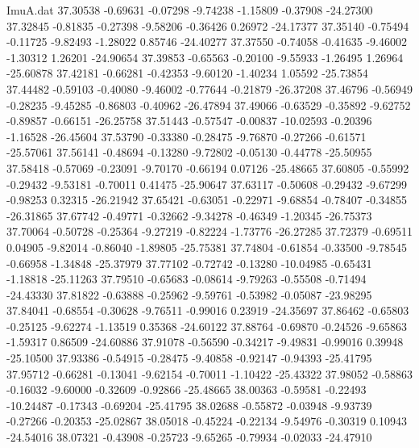 \begin{filecontents}{ImuA.dat}
  37.30538   -0.69631   -0.07298   -9.74238   -1.15809   -0.37908  -24.27300
  37.32845   -0.81835   -0.27398   -9.58206   -0.36426    0.26972  -24.17377
  37.35140   -0.75494   -0.11725   -9.82493   -1.28022    0.85746  -24.40277
  37.37550   -0.74058   -0.41635   -9.46002   -1.30312    1.26201  -24.90654
  37.39853   -0.65563   -0.20100   -9.55933   -1.26495    1.26964  -25.60878
  37.42181   -0.66281   -0.42353   -9.60120   -1.40234    1.05592  -25.73854
  37.44482   -0.59103   -0.40080   -9.46002   -0.77644   -0.21879  -26.37208
  37.46796   -0.56949   -0.28235   -9.45285   -0.86803   -0.40962  -26.47894
  37.49066   -0.63529   -0.35892   -9.62752   -0.89857   -0.66151  -26.25758
  37.51443   -0.57547   -0.00837  -10.02593   -0.20396   -1.16528  -26.45604
  37.53790   -0.33380   -0.28475   -9.76870   -0.27266   -0.61571  -25.57061
  37.56141   -0.48694   -0.13280   -9.72802   -0.05130   -0.44778  -25.50955
  37.58418   -0.57069   -0.23091   -9.70170   -0.66194    0.07126  -25.48665
  37.60805   -0.55992   -0.29432   -9.53181   -0.70011    0.41475  -25.90647
  37.63117   -0.50608   -0.29432   -9.67299   -0.98253    0.32315  -26.21942
  37.65421   -0.63051   -0.22971   -9.68854   -0.78407   -0.34855  -26.31865
  37.67742   -0.49771   -0.32662   -9.34278   -0.46349   -1.20345  -26.75373
  37.70064   -0.50728   -0.25364   -9.27219   -0.82224   -1.73776  -26.27285
  37.72379   -0.69511    0.04905   -9.82014   -0.86040   -1.89805  -25.75381
  37.74804   -0.61854   -0.33500   -9.78545   -0.66958   -1.34848  -25.37979
  37.77102   -0.72742   -0.13280  -10.04985   -0.65431   -1.18818  -25.11263
  37.79510   -0.65683   -0.08614   -9.79263   -0.55508   -0.71494  -24.43330
  37.81822   -0.63888   -0.25962   -9.59761   -0.53982   -0.05087  -23.98295
  37.84041   -0.68554   -0.30628   -9.76511   -0.99016    0.23919  -24.35697
  37.86462   -0.65803   -0.25125   -9.62274   -1.13519    0.35368  -24.60122
  37.88764   -0.69870   -0.24526   -9.65863   -1.59317    0.86509  -24.60886
  37.91078   -0.56590   -0.34217   -9.49831   -0.99016    0.39948  -25.10500
  37.93386   -0.54915   -0.28475   -9.40858   -0.92147   -0.94393  -25.41795
  37.95712   -0.66281   -0.13041   -9.62154   -0.70011   -1.10422  -25.43322
  37.98052   -0.58863   -0.16032   -9.60000   -0.32609   -0.92866  -25.48665
  38.00363   -0.59581   -0.22493  -10.24487   -0.17343   -0.69204  -25.41795
  38.02688   -0.55872   -0.03948   -9.93739   -0.27266   -0.20353  -25.02867
  38.05018   -0.45224   -0.22134   -9.54976   -0.30319    0.10943  -24.54016
  38.07321   -0.43908   -0.25723   -9.65265   -0.79934   -0.02033  -24.47910

\end{filecontents}
